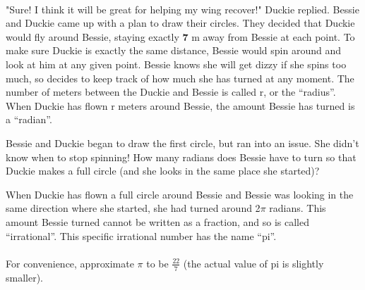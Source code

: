 \paragraph{} "Sure! I think it will be great for helping my wing recover!" Duckie replied.
\vfill
\pagebreak
 {Bessie and Duckie came up with a plan to draw their circles. They decided that Duckie would fly around Bessie, staying exactly \textbf{7} m away from Bessie at each point. To make sure Duckie is exactly the same distance, Bessie would spin around and look at him at any given point. Bessie knows she will get dizzy if she spins too much, so decides to keep track of how much she has turned at any moment.}
 {}
 {The number of meters between the Duckie and Bessie is called r, or the “radius”. When Duckie has flown r meters around Bessie, the amount Bessie has turned is a “radian”.}
 {}
 {Bessie and Duckie began to draw the first circle, but ran into an issue. She didn't know when to stop spinning! How many radians does Bessie have to turn so that Duckie makes a full circle (and she looks in the same place she started)?}
 {}
 {When Duckie has flown a full circle around Bessie and Bessie was looking in the same direction where she started, she had turned around 2$\pi$ radians. This amount Bessie turned cannot be written as a fraction, and so is called “irrational”. This specific irrational number has the name “pi”. 
 \paragraph{} For convenience, approximate $\pi$ to be $\frac{22}{7}$ (the actual value of pi is slightly smaller).}
 {}
